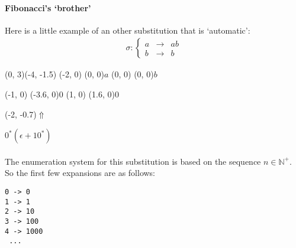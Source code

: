 \documentclass{article}
\begin{document}
\paragraph{Fibonacci's `brother'}
Here is a little example of an other substitution that is `automatic':
\begin{eqnarray*}
\sigma: \left\{ \begin{array}{lll}
a &\rightarrow& ab\\
b &\rightarrow& b
\end{array} \right.
\end{eqnarray*}
\begin{graph}(0, 3)(-4, -1.5)
  (-2, 0) (0, 0){$a$}
  (0, 0)  (0, 0){$b$}

  (-1, 0) \freetext(-3.6, 0){0}
   
  (1, 0) \freetext(1.6, 0){0}

  \freetext(-2, -0.7){$\Uparrow$}
\end{graph} $0^* (\epsilon + 10^*)$\\
\\
The enumeration system for this substitution is based on the sequence 
$n \in \mathbb{N}^+$. So the first few expansions are as follows:
\begin{verbatim}
0 -> 0
1 -> 1
2 -> 10
3 -> 100
4 -> 1000
 ...
\end{verbatim}
\end{document}
